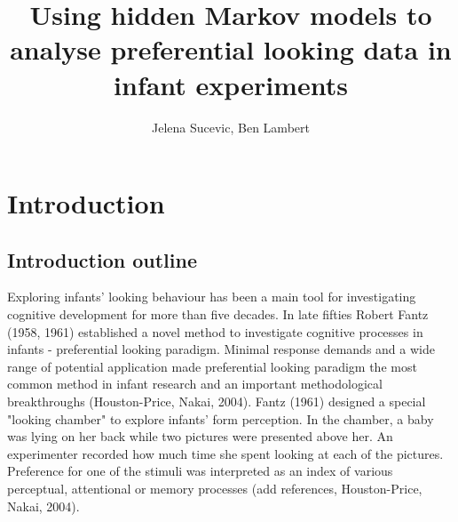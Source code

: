 \documentclass[a4paper,man,natbib]{apa6}
\title{Using hidden Markov models to analyse preferential looking data in infant experiments}
\author{Jelena Sucevic, Ben Lambert}
\affiliation{University of Oxford}
\begin{document}
\maketitle

\section{Introduction}

\subsection{Introduction outline}


Exploring infants' looking behaviour has been a main tool for investigating cognitive development for more than five decades. In late fifties Robert Fantz (1958, 1961) established a novel method to investigate cognitive processes in infants - preferential looking paradigm. Minimal response demands and a wide range of potential application made preferential looking paradigm the most common method in infant research and an important methodological breakthroughs (Houston-Price, Nakai, 2004). Fantz (1961) designed a special "looking chamber" to explore infants' form perception. In the chamber, a baby was lying on her back while two pictures were presented above her. An experimenter recorded how much time she spent looking at each of the pictures. Preference for one of the stimuli was interpreted as an index of various perceptual, attentional or memory processes (add references, Houston-Price, Nakai, 2004).
\end{document}
